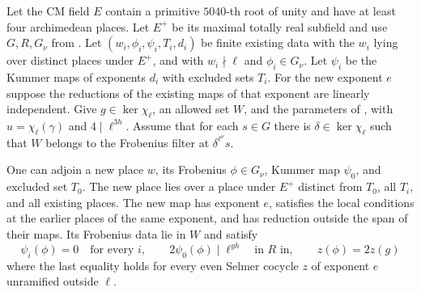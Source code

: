 \begin{lemma}
\label{lem:c-triangle-next-prime}
\emitthmsource
Let the CM field $E$ contain a primitive $5040$-th root of unity and have at least four archimedean places. Let $E^+$ be its maximal totally real subfield and use $G,R,G_\nu$ from . Let $(w_i,\phi_i,\psi_i,T_i,d_i)$ be finite existing data with the $w_i$ lying over distinct places under $E^+$, and with $w_i\nmid\ell$ and $\phi_i\in G_\nu$. Let $\psi_i$ be the Kummer maps of exponents $d_i$ with excluded sets $T_i$. For the new exponent $e$ suppose the reductions of the existing maps of that exponent are linearly independent. Give $g\in\ker\chi_\ell$, an allowed set $W$, and the parameters of , with $u=\chi_\ell(\gamma)$ and $4\mid\ell^{3h}$. Assume that for each $s\in G$ there is $\delta\in\ker\chi_\ell$ such that $W$ belongs to the Frobenius filter at $\delta^{\ell^\nu}s$.

One can adjoin a new place $w$, its Frobenius $\phi\in G_\nu$, Kummer map $\psi_0$, and excluded set $T_0$. The new place lies over a place under $E^+$ distinct from $T_0$, all $T_i$, and all existing places. The new map has exponent $e$, satisfies the local conditions at the earlier places of the same exponent, and has reduction outside the span of their maps. Its Frobenius data lie in $W$ and satisfy
\[
 \psi_i(\phi)=0\quad\text{for every }i,\qquad
 2\psi_0(\phi)\mid\ell^{yh}\quad\text{in }R\text{ in},\qquad
 z(\phi)=2z(g)
\]
where the last equality holds for every even Selmer cocycle $z$ of exponent $e$ unramified outside $\ell$.
\end{lemma}
